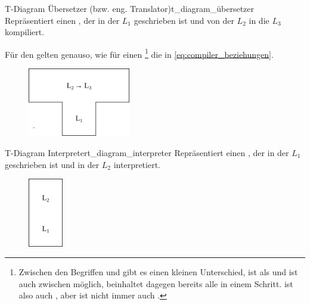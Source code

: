 \begin{Definition}{T-Diagram Übersetzer (bzw. eng. Translator)}{t_diagram_übersetzer}
  Repräsentiert einen , der in der  $L_1$ geschrieben ist und  von der  $L_2$ in die  $L_3$ kompiliert.

  Für den  gelten genauso, wie für einen \footnote{Zwischen den Begriffen  und  gibt es einen kleinen Unterschied,  ist  als  und ist auch zwischen  möglich,  beinhaltet dagegen bereits alle  in einem Schritt.  ist also auch , aber  ist nicht immer auch .} die  in \ref{eq:compiler_beziehungen}.
  \begin{figure}[H]
    \centering
    \includegraphics[height=3cm]{./figures/uerbersetzer.png}
  \end{figure}
\end{Definition}

\begin{Definition}{T-Diagram Interpreter}{t_diagram_interpreter}
  Repräsentiert einen , der in der  $L_1$ geschrieben ist und  in der  $L_2$ interpretiert.
  \begin{figure}[H]
    \centering
    \includegraphics[height=3cm]{./figures/interpreter.png}
  \end{figure}
\end{Definition}

